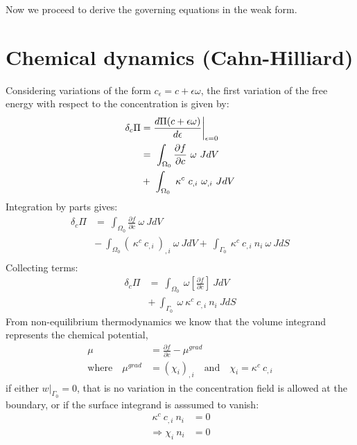 \noindent Now we proceed to derive the governing equations in the weak form.

\section{Chemical dynamics (Cahn-Hilliard)}
Considering variations of the form $c_{\epsilon} = c + \epsilon \omega$, the first variation of the free energy with respect to the concentration is given by:
\begin{align}
\delta_{c}\Pi &= \frac{d \Pi(c + \epsilon \omega)}{d\epsilon} \bigg|_{\epsilon=0} \notag  \nonumber \\
  &= ~\int_{\Omega_0}  \frac{\partial f}{\partial c}~\omega ~J dV  \nonumber \\
  &+ ~\int_{\Omega_0}  ~\kappa^c~c_{,i}~\omega_{,i} ~J dV  
\end{align}
Integration by parts gives:
\begin{align}
\delta_{c}\Pi &= ~\int_{\Omega_0}  \frac{\partial f}{\partial c}~\omega ~J dV  \nonumber \\
  &- ~\int_{\Omega_0}  \left(~\kappa^c~c_{,i}~\right)_{,i} ~\omega ~J dV + ~\int_{\Gamma_0} ~\kappa^c~c_{,i} ~n_{i} ~\omega ~J dS  \nonumber \\
\end{align}
Collecting terms:
\begin{align}
\delta_{c}\Pi &= ~\int_{\Omega_0}  ~\omega \left[\frac{\partial f}{\partial c}  \right] ~J dV  \nonumber \\
  &+ ~\int_{\Gamma_0} ~\omega  ~\kappa^c~c_{,i}  ~n_{i} ~J dS
\end{align}
From non-equilibrium thermodynamics we know that the volume integrand represents the chemical potential, 
\begin{align}
\mu &= \frac{\partial f}{\partial c} - \mu^{grad}  \label{eqMU}\\
\text{where} \quad \mu^{grad} &= (\chi_i)_{,i} \quad \text{and} \quad \chi_i = \kappa^c~c_{,i} 
\end{align}
if either $w|_{\Gamma_0}=0$, that is no variation in the concentration field is allowed at the boundary, or if the surface integrand is asssumed to vanish:
\begin{align}
 ~\kappa^c~c_{,i}  ~n_{i} &= 0 \nonumber \\
\Rightarrow \chi_i ~ n_{i} &= 0 
\label{eqSurfaceCondition}
\end{align}

